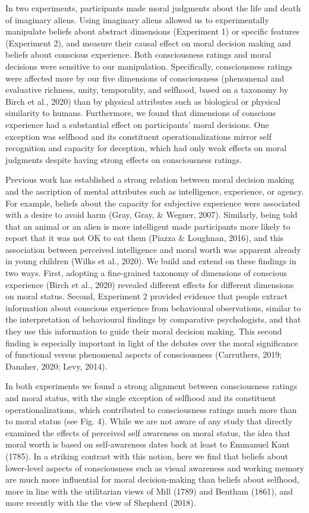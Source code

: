 \documentclass[10pt, letterpaper]{article}
\begin{document}
In two experiments, participants made moral judgments about the life and
death of imaginary aliens. Using imaginary aliens allowed us to
experimentally manipulate beliefs about abstract dimensions (Experiment
1) or specific features (Experiment 2), and measure their causal effect
on moral decision making and beliefs about conscious experience. Both
consciousness ratings and moral decisions were sensitive to our
manipulation. Specifically, consciousness ratings were affected more by
our five dimensions of consciousness (phenomenal and evaluative
richness, unity, temporality, and selfhood, based on a taxonomy by Birch
et al., 2020) than by physical attributes such as biological or physical
similarity to humans. Furthermore, we found that dimensions of conscious
experience had a substantial effect on participants' moral decisions.
One exception was selfhood and its constituent operationalizations
mirror self recognition and capacity for deception, which had only weak
effects on moral judgments despite having strong effects on
consciousness ratings.

Previous work has established a strong relation between moral decision
making and the ascription of mental attributes such as intelligence,
experience, or agency. For example, beliefs about the capacity for
subjective experience were associated with a desire to avoid harm (Gray,
Gray, \& Wegner, 2007). Similarly, being told that an animal or an alien
is more intelligent made participants more likely to report that it was
not OK to eat them (Piazza \& Loughnan, 2016), and this association
between perceived intelligence and moral worth was apparent already in
young children (Wilks et al., 2020). We build and extend on these
findings in two ways. First, adopting a fine-grained taxonomy of
dimensions of conscious experience (Birch et al., 2020) revealed
different effects for different dimensions on moral status. Second,
Experiment 2 provided evidence that people extract information about
conscious experience from behavioural observations, similar to the
interpretation of behavioural findings by comparative psychologists, and
that they use this information to guide their moral decision making.
This second finding is especially important in light of the debates over
the moral significance of functional versus phenomenal aspects of
consciousness (Carruthers, 2019; Danaher, 2020; Levy, 2014).

In both experiments we found a strong alignment between consciousness
ratings and moral status, with the single exception of selfhood and its
constituent operationalizations, which contributed to consciousness
ratings much more than to moral status (see Fig. 4). While we are not
aware of any study that directly examined the effects of perceived self
awareness on moral status, the idea that moral worth is based on
self-awareness dates back at least to Emmanuel Kant (1785). In a
striking contrast with this notion, here we find that beliefs about
lower-level aspects of consciousness such as visual awareness and
working memory are much more influential for moral decision-making than
beliefs about selfhood, more in line with the utilitarian views of Mill
(1789) and Bentham (1861), and more recently with the the view of
Shepherd (2018).
\end{document}
